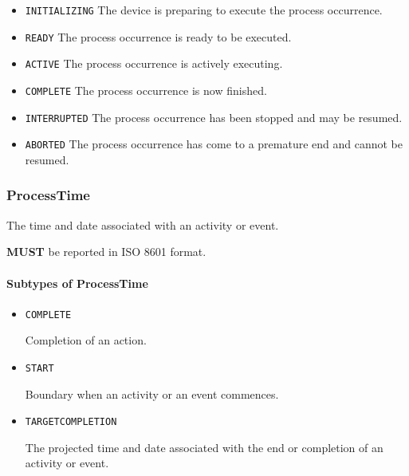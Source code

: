 \begin{itemize}
\item \texttt{INITIALIZING} \newline The device is preparing to execute the process occurrence. 
\item \texttt{READY} \newline The process occurrence is ready to be executed. 
\item \texttt{ACTIVE} \newline The process occurrence is actively executing. 
\item \texttt{COMPLETE} \newline The process occurrence is now finished. 
\item \texttt{INTERRUPTED} \newline The process occurrence has been stopped and may be resumed. 
\item \texttt{ABORTED} \newline The process occurrence has come to a premature end and cannot be resumed. 
\end{itemize}



\subsubsection{ProcessTime}
\label{sec:ProcessTime}



The time and date associated with an activity or event.
  
 \textbf{MUST} be reported in ISO 8601 format.


\paragraph{Subtypes of ProcessTime}\mbox{}
\label{sec:Subtypes of ProcessTime}

\begin{itemize}

\item \texttt{COMPLETE}


Completion of an action.

\item \texttt{START}


Boundary when an activity or an event commences.

\item \texttt{TARGET\textunderscore COMPLETION}


The projected time and date associated with the end or completion of an activity or event.


\end{itemize}






